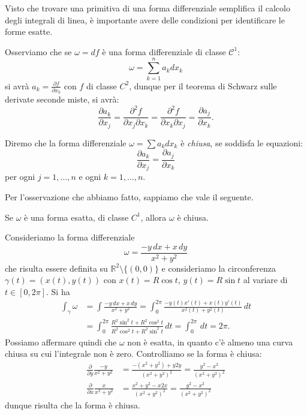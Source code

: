 \documentclass[italian,a4paper]{scrartcl}
\newcommand{\RR}{{\mathbb R}}
\begin{document}
Visto che trovare una primitiva di una forma differenziale semplifica
il calcolo degli integrali di linea, è importante avere delle
condizioni per identificare le forme esatte.

Osserviamo che se $\omega = df$ è una forma differenziale di classe
$\mathcal C^1$:
\[
 \omega = \sum_{k=1}^n a_k dx_k
\]
si avrà $a_k = \frac{\partial f}{\partial x_k}$ 
con $f$ di classe $C^2$, dunque per il teorema
di Schwarz sulle derivate seconde miste, si avrà:
\[
 \frac{\partial a_k}{\partial x_j} = \frac{\partial^2 f}{\partial x_j
   \partial x_k} = \frac{\partial^2 f}{\partial x_k \partial x_j}
=\frac{\partial a_j}{\partial x_k}.
\]

Diremo che la forma differenziale $\omega = \sum a_k dx_k$ è
\emph{chiusa}, se soddisfa le equazioni:
\[
  \frac{\partial a_k}{\partial x_j} = \frac{\partial a_j}{\partial
    x_k}
\]
per ogni $j=1,\dots, n$ e ogni $k=1,\dots,n$.

Per l'osservazione che abbiamo fatto, sappiamo che vale il seguente.
\begin{theorem}
Se $\omega$ è una forma esatta, di classe $C^1$, 
allora $\omega$ è chiusa.
\end{theorem}

\begin{example}
\label{ex:forma_chiusa_non_esatta}
Consideriamo la forma differenziale
\begin{equation}\label{eq:forma_chiusa_non_esatta}
\omega = \frac{-y\, dx + x\,
  dy}{x^2+y^2}
\end{equation}
che risulta essere definita su $\RR^2 \setminus \{(0,0)\}$ e consideriamo
la circonferenza $\gamma(t)=(x(t),y(t))$ con $x(t) = R \cos t$, $y(t)=R
\sin t$ al variare di $t\in [0,2\pi]$.
Si ha
\begin{align*}
\int_\gamma \omega & = \int \frac{-y\, dx + x\, dy}{x^2+y^2}
=\int_0^{2\pi} \frac{-y(t) x'(t) + x(t) y'(t)}{x^2(t)+y^2(t)}\, dt\\
&=\int_0^{2\pi} \frac{R^2 \sin^2 t + R^2 \cos^2 t}{R^2\cos^2 t +
  R^2\sin^2 t}\, dt = \int_0^{2\pi}\, dt = 2\pi.
\end{align*}
Possiamo affermare quindi che $\omega$ non è esatta, in quanto
c'è almeno una curva chiusa su cui l'integrale non è zero.
Controlliamo se la forma è
chiusa:
\begin{align*}
\frac{\partial}{\partial y}\frac{-y}{x^2+y^2}
& = \frac{-(x^2+y^2)+y2y}{(x^2+y^2)^2}
= \frac{y^2 - x^2}{(x^2+y^2)^2}\\
\frac{\partial}{\partial x}\frac{x}{x^2+y^2}
& = \frac{x^2+y^2-x2x}{(x^2+y^2)^2}
= \frac{y^2 - x^2}{(x^2+y^2)^2}
\end{align*}
dunque risulta che la forma è chiusa.
\end{example}
\end{document}
